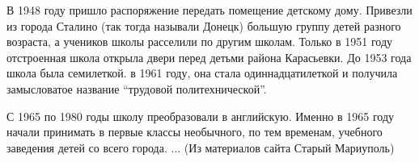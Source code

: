В 1948 году пришло распоряжение передать помещение детскому дому. Привезли из
города Сталино (так тогда называли Донецк) большую группу детей разного
возраста, а учеников школы расселили по другим школам.  Только в 1951 году
отстроенная школа  открыла двери перед детьми  района Карасьевки. До 1953 года
школа была семилеткой. в 1961 году, она стала одиннадцатилеткой и получила
замысловатое название \enquote{трудовой политехнической}.

С 1965 по 1980 годы школу  преобразовали в английскую. Именно в 1965 году
начали принимать в первые классы необычного, по тем временам, учебного
заведения детей со всего города. ... (Из материалов сайта Старый Мариуполь)

